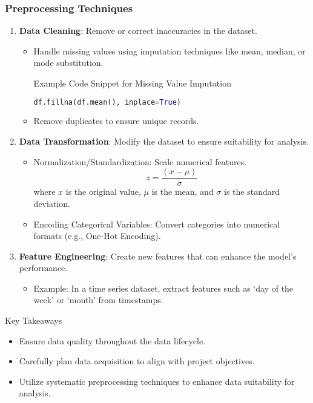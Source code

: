 \documentclass[aspectratio=169]{beamer}
\begin{document}
\begin{frame}[fragile]
    \frametitle{Preprocessing Techniques}
    \begin{enumerate}
        \item \textbf{Data Cleaning}: Remove or correct inaccuracies in the dataset.
        \begin{itemize}
            \item Handle missing values using imputation techniques like mean, median, or mode substitution.
            \begin{block}{Example Code Snippet for Missing Value Imputation}
                \begin{lstlisting}[language=Python]
df.fillna(df.mean(), inplace=True)
                \end{lstlisting}
            \end{block}
            \item Remove duplicates to ensure unique records.
        \end{itemize}
        
        \item \textbf{Data Transformation}: Modify the dataset to ensure suitability for analysis.
        \begin{itemize}
            \item Normalization/Standardization: Scale numerical features.
            \begin{equation}
                z = \frac{(x - \mu)}{\sigma}
            \end{equation}
            where \( x \) is the original value, \( \mu \) is the mean, and \( \sigma \) is the standard deviation.
            \item Encoding Categorical Variables: Convert categories into numerical formats (e.g., One-Hot Encoding).
        \end{itemize}
        
        \item \textbf{Feature Engineering}: Create new features that can enhance the model's performance.
        \begin{itemize}
            \item Example: In a time series dataset, extract features such as ‘day of the week’ or ‘month’ from timestamps.
        \end{itemize}
    \end{enumerate}
    \begin{block}{Key Takeaways}
        \begin{itemize}
            \item Ensure data quality throughout the data lifecycle.
            \item Carefully plan data acquisition to align with project objectives.
            \item Utilize systematic preprocessing techniques to enhance data suitability for analysis.
        \end{itemize}
    \end{block}
\end{frame}
\end{document}
